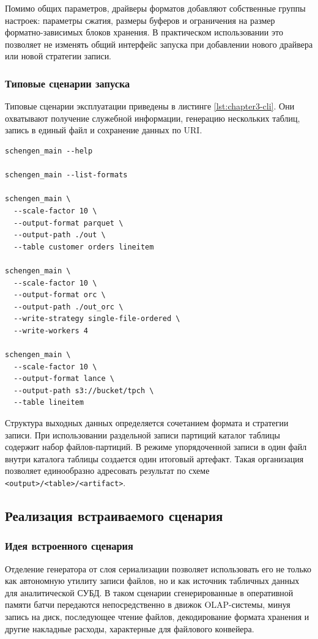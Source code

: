 Помимо общих параметров, драйверы форматов добавляют собственные группы
настроек: параметры сжатия, размеры буферов и ограничения на размер
форматно-зависимых блоков хранения. В практическом использовании это позволяет
не изменять общий интерфейс запуска при добавлении нового драйвера или новой
стратегии записи.

\subsubsection{Типовые сценарии запуска}

Типовые сценарии эксплуатации приведены в листинге
\ref{lst:chapter3-cli}. Они охватывают получение служебной информации,
генерацию нескольких таблиц, запись в единый файл и сохранение данных по
URI.

\begin{lstlisting}[style=reportlisting,caption={Примеры запуска генератора},label={lst:chapter3-cli}]
schengen_main --help

schengen_main --list-formats

schengen_main \
  --scale-factor 10 \
  --output-format parquet \
  --output-path ./out \
  --table customer orders lineitem

schengen_main \
  --scale-factor 10 \
  --output-format orc \
  --output-path ./out_orc \
  --write-strategy single-file-ordered \
  --write-workers 4

schengen_main \
  --scale-factor 10 \
  --output-format lance \
  --output-path s3://bucket/tpch \
  --table lineitem
\end{lstlisting}

Структура выходных данных определяется сочетанием формата и стратегии записи.
При использовании раздельной записи партиций каталог таблицы содержит набор
файлов-партиций. В режиме упорядоченной записи в один файл внутри каталога таблицы
создается один итоговый артефакт. Такая организация позволяет единообразно
адресовать результат по схеме \texttt{<output>/<table>/<artifact>}.

\subsection{Реализация встраиваемого сценария}

\subsubsection{Идея встроенного сценария}

Отделение генератора от слоя сериализации позволяет использовать его не только
как автономную утилиту записи файлов, но и как источник табличных данных для
аналитической СУБД. В таком сценарии сгенерированные в оперативной памяти
батчи передаются непосредственно в движок OLAP-системы, минуя запись
на диск, последующее чтение файлов, декодирование формата хранения и другие
накладные расходы, характерные для файлового конвейера.

